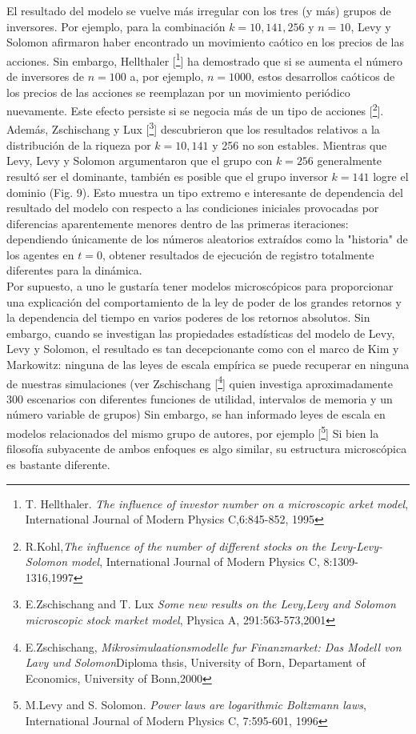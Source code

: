 \documentclass[12pt,a4paper]{article}
\begin{document}
\quad El resultado del modelo se vuelve más irregular con los tres (y más) grupos de inversores. Por ejemplo, para la combinación $ k = 10,141,256 $ y $ n = 10 $, Levy y Solomon afirmaron haber encontrado un movimiento caótico en los precios de las acciones. Sin embargo, Hellthaler [\footnote{T. Hellthaler. \textit{The influence of investor number on a microscopic arket model}, International Journal of Modern Physics C,6:845-852, 1995 }] ha demostrado que si se aumenta el número de inversores de $ n = 100 $ a, por ejemplo, $ n = 1000 $, estos desarrollos caóticos de los precios de las acciones se reemplazan por un movimiento periódico nuevamente. Este efecto persiste si se negocia más de un tipo de acciones [\footnote{R.Kohl,\textit{The influence of the number of different stocks on the Levy-Levy-Solomon model}, International Journal of Modern Physics C, 8:1309-1316,1997}]. Además, Zschischang y Lux [\footnote{E.Zschischang and T. Lux \textit{Some new results on the Levy,Levy and Solomon microscopic stock market model}, Physica A, 291:563-573,2001}] descubrieron que los resultados relativos a la distribución de la riqueza por $ k = 10,141 $ y 256 no son estables. Mientras que Levy, Levy y Solomon argumentaron que el grupo con $ k = 256 $ generalmente resultó ser el dominante, también es posible que el grupo inversor $ k = 141 $ logre el dominio (Fig. 9). Esto muestra un tipo extremo e interesante de dependencia del resultado del modelo con respecto a las condiciones iniciales provocadas por diferencias aparentemente menores dentro de las primeras iteraciones: dependiendo únicamente de los números aleatorios extraídos como la "historia" de los agentes en $ t = 0 $, obtener resultados de ejecución de registro totalmente diferentes para la dinámica.\\
\quad Por supuesto, a uno le gustaría tener modelos microscópicos para proporcionar una explicación del comportamiento de la ley de poder de los grandes retornos y la dependencia del tiempo en varios poderes de los retornos absolutos. Sin embargo, cuando se investigan las propiedades estadísticas del modelo de Levy, Levy y Solomon, el resultado es tan decepcionante como con el marco de Kim y Markowitz: ninguna de las leyes de escala empírica se puede recuperar en ninguna de nuestras simulaciones (ver Zschischang [\footnote{E.Zschischang, \textit{Mikrosimulaationsmodelle fur Finanzmarket: Das Modell von Lavy und Solomon}Diploma thsis, University of Born, Departament of Economics, University of Bonn,2000}] quien investiga aproximadamente 300 escenarios con diferentes funciones de utilidad, intervalos de memoria y un número variable de grupos) Sin embargo, se han informado leyes de escala en modelos relacionados del mismo grupo de autores, por ejemplo [\footnote{M.Levy and S. Solomon. \textit{Power laws are logarithmic Boltzmann laws}, International Journal of Modern Physics C, 7:595-601, 1996}] Si bien la filosofía subyacente de ambos enfoques es algo similar, su estructura microscópica es bastante diferente.\\
\end{document}
